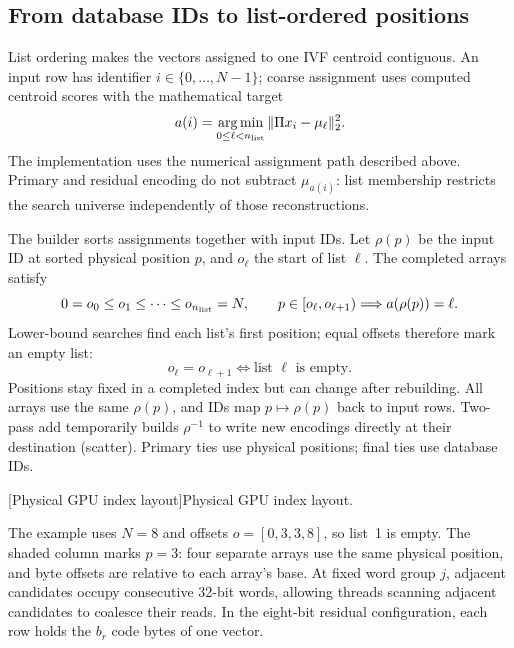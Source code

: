 \subsection{From database IDs to list-ordered positions}

List ordering makes the vectors assigned to one IVF centroid contiguous.
An input row has identifier $i\in\{0,\ldots,N-1\}$; coarse assignment
uses computed centroid scores with the mathematical target
\begin{equation}
 a(i)=\operatorname*{arg\,min}_{0\leq\ell<n_{\rm list}}
       \|\Pi x_i-\mu_\ell\|_2^2.
 \label{eq:4-assignment}
\end{equation}
The implementation uses the numerical assignment path described above.
Primary and residual encoding do not subtract $\mu_{a(i)}$: list
membership restricts the search universe independently of those
reconstructions.

The builder sorts assignments together with input IDs. Let $\rho(p)$
be the input ID at sorted physical position $p$, and $o_\ell$ the start
of list $\ell$. The completed arrays satisfy
\begin{equation}
 0=o_0\leq o_1\leq\cdots\leq o_{n_{\rm list}}=N,
 \qquad p\in[o_\ell,o_{\ell+1})\Longrightarrow a(\rho(p))=\ell.
 \label{eq:4-offsets}
\end{equation}
Lower-bound searches find each list's first position; equal offsets
therefore mark an empty list:
\[
 o_\ell=o_{\ell+1}\Longleftrightarrow\text{list }\ell\text{ is empty}.
\]
Positions stay fixed in a completed index but can change after
rebuilding. All arrays use the same $\rho(p)$, and IDs map
$p\mapsto\rho(p)$ back to input rows. Two-pass add temporarily builds
$\rho^{-1}$ to write new encodings directly at their destination
(scatter). Primary ties use physical positions; final ties use database
IDs.

\par\medskip\noindent\begin{minipage}{\linewidth}
\captionsetup{hypcap=false}
\centering

[Physical GPU index layout]{Physical GPU index layout.}
\label{fig:4-layout}
\end{minipage}\par\medskip

The example uses $N=8$ and offsets $o=[0,3,3,8]$, so list~1 is empty. The shaded column marks $p=3$: four separate arrays use the same physical position, and byte offsets are relative to each array's base. At fixed word group $j$, adjacent candidates occupy consecutive 32-bit words, allowing threads scanning adjacent candidates to coalesce their reads. In the eight-bit residual configuration, each row holds the $b_r$ code bytes of one vector.

